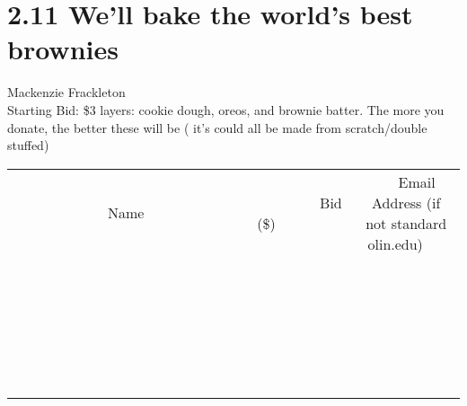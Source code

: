 \documentclass[11pt]{article}
\begin{document}
\section*{2.11 We'll bake the world's best brownies }
Mackenzie Frackleton
\\
Starting Bid: \$3
 layers: cookie dough, oreos, and brownie batter. The more you donate, the better these will be ( it's could all be made from scratch/double stuffed)
\\[6ex]
\begin{tabular}{c c c}
~~~~~~~~~~~~~Name~~~~~~~~~~~~~ & ~~~~~~~~~Bid (\$)~~~~~~~~~  & ~~~Email Address (if not standard olin.edu)~~~\\
 & & \\
\hline
 & & \\
\hline
 & & \\
\hline
 & & \\
\hline
 & & \\
\hline
 & & \\
\hline
 & & \\
\hline
 & & \\
\hline
 & & \\
\hline
 & & \\
\hline
 & & \\
\hline
 & & \\
\hline
 & & \\
\hline
 & & \\
\hline
 & & \\
\hline
 & & \\
\hline
 & & \\
\hline
 & & \\
\hline
 & & \\
\hline
 & & \\
\hline
 & & \\
\hline
 & & \\
\hline
 & & \\
\hline
 & & \\
\hline
 & & \\
\hline
 & & \\
\hline
\end{tabular}
\newpage
\end{document}

